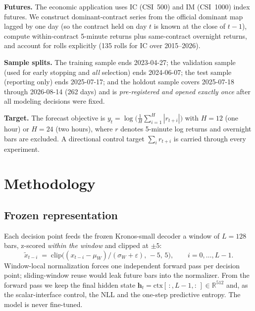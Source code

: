 \documentclass[12pt]{article}
\begin{document}
\textbf{Futures.} The economic application uses IC (CSI~500) and IM
(CSI~1000) index futures. We construct dominant-contract series from the
official dominant map lagged by one day (so the contract held on day $t$ is
known at the close of $t-1$), compute within-contract 5-minute returns plus
same-contract overnight returns, and account for rolls explicitly (135 rolls
for IC over 2015--2026).

\textbf{Sample splits.} The training sample ends 2023-04-27; the validation
sample (used for early stopping and \emph{all} selection) ends 2024-06-07; the
test sample (reporting only) ends 2025-07-17; and the holdout sample covers
2025-07-18 through 2026-08-14 (262 days) and is \emph{pre-registered and
opened exactly once} after all modeling decisions were fixed.

\textbf{Target.} The forecast objective is
$y_t = \log\big(\tfrac1H \sum_{i=1}^{H} |r_{t+i}|\big)$ with $H=12$ (one hour)
or $H=24$ (two hours), where $r$ denotes 5-minute log returns and overnight
bars are excluded. A directional control target $\sum_i r_{t+i}$ is carried
through every experiment.

\section{Methodology}\label{sec:method}
\subsection{Frozen representation}
Each decision point feeds the frozen Kronos-small decoder a window of $L=128$
bars, z-scored \emph{within the window} and clipped at $\pm5$:
\begin{equation}
\tilde{x}_{t-i} \;=\; \mathrm{clip}\!\big((x_{t-i}-\mu_W)/(\sigma_W+\varepsilon),\,-5,\,5\big),
\qquad i = 0,\dots,L-1 .
\end{equation}
Window-local normalization forces one independent forward pass per decision
point; sliding-window reuse would leak future bars into the normalizer. From
the forward pass we keep the final hidden state
$\mathbf{h}_t = \mathrm{ctx}[\,:, L{-}1, :\,] \in \mathbb{R}^{512}$ and, as the
scalar-interface control, the NLL and the one-step predictive entropy. The
model is never fine-tuned.
\end{document}
